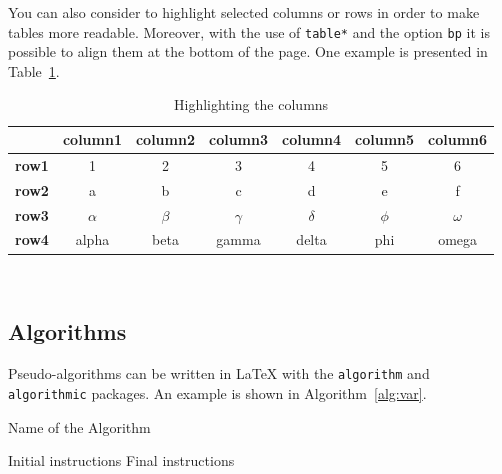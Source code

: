 \documentclass[11pt,a4paper]{article}
\begin{document}
You can also consider to highlight selected columns or rows in order to make tables more readable.
Moreover, with the use of \texttt{table*} and the option \texttt{bp} it is possible to align them at the bottom of the page. One example is presented in Table~\ref{table:exampleC}.

\begin{table}[bp]
    \centering
    \begin{tabular}{|p{3em} | c | c | c | c | c | c|}
        \hline
                      & \textbf{column1} & \textbf{column2} & \textbf{column3} & \textbf{column4} & \textbf{column5} & \textbf{column6} \T\B \\
        \hline \hline
        \textbf{row1} & 1                & 2                & 3                & 4                & 5                & 6 \T\B                \\
        \textbf{row2} & a                & b                & c                & d                & e                & f \T\B                \\
        \textbf{row3} & $\alpha$         & $\beta$          & $\gamma$         & $\delta$         & $\phi$           & $\omega$ \T\B         \\
        \textbf{row4} & alpha            & beta             & gamma            & delta            & phi              & omega \B              \\
        \hline
    \end{tabular}
    \\[10pt]
    \caption{Highlighting the columns}
    \label{table:exampleC}
\end{table}

\subsection{Algorithms}
\label{subsec:algorithms}

Pseudo-algorithms can be written in \LaTeX{} with the \texttt{algorithm} and \texttt{algorithmic} packages.
An example is shown in Algorithm~\ref{alg:var}.
\begin{algorithm}[H]
    \label{alg:example}
    \caption{Name of the Algorithm}
    \label{alg:var}
    \label{protocol1}
    \begin{algorithmic}[1]
        \STATE Initial instructions
        \ENDIF
        \ENDFOR
        \ENDWHILE
        \STATE Final instructions
    \end{algorithmic}
\end{algorithm}
\end{document}
